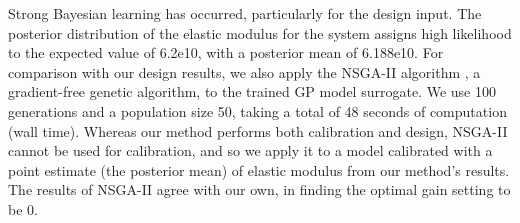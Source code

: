 \documentclass[twocolumn,10pt]{asme2ej}
\begin{document}
%
Strong Bayesian learning has occurred, particularly for the design input.
%
The posterior distribution of the elastic modulus for the system assigns high likelihood to the expected value of 6.2e10, with a posterior mean of 6.188e10.
%
For comparison with our design results, we also apply the NSGA-II algorithm \cite{Deb2002}, a gradient-free genetic algorithm, to the trained GP model surrogate.
%
We use 100 generations and a population size 50, taking a total of 48 seconds of computation (wall time).
%
Whereas our method performs both calibration and design, NSGA-II cannot be used for calibration, and so we apply it to a model calibrated with a point estimate (the posterior mean) of elastic modulus from our method's results.
%
The results of NSGA-II agree with our own, in finding the optimal gain setting to be 0.
%
\end{document}
